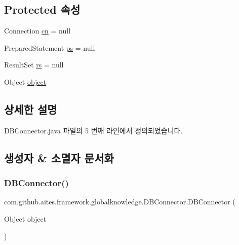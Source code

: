 \subsection*{Protected 속성}
\begin{DoxyCompactItemize}
\item 
Connection \mbox{\hyperlink{classcom_1_1github_1_1aites_1_1framework_1_1globalknowledge_1_1_d_b_connector_af00c95ca08c2b39cb47ee4286e9f2469}{cn}} = null
\item 
Prepared\+Statement \mbox{\hyperlink{classcom_1_1github_1_1aites_1_1framework_1_1globalknowledge_1_1_d_b_connector_a2a6dbc151015e5fe147a4d155ae7a145}{ps}} = null
\item 
Result\+Set \mbox{\hyperlink{classcom_1_1github_1_1aites_1_1framework_1_1globalknowledge_1_1_d_b_connector_a36c87b41d86e8382bea688b2ca209764}{rs}} = null
\item 
Object \mbox{\hyperlink{classcom_1_1github_1_1aites_1_1framework_1_1globalknowledge_1_1_d_b_connector_ab6f6f9f00c22d311dca48a3a424fd6a3}{object}}
\end{DoxyCompactItemize}


\subsection{상세한 설명}


D\+B\+Connector.\+java 파일의 5 번째 라인에서 정의되었습니다.



\subsection{생성자 \& 소멸자 문서화}
\mbox{\label{classcom_1_1github_1_1aites_1_1framework_1_1globalknowledge_1_1_d_b_connector_a77b6f20c18ea2320ff73ab8d135ce00b}} 
\subsubsection{\texorpdfstring{D\+B\+Connector()}{DBConnector()}\hspace{0.1cm}{\footnotesize\ttfamily [1/3]}}
{\footnotesize\ttfamily com.\+github.\+aites.\+framework.\+globalknowledge.\+D\+B\+Connector.\+D\+B\+Connector (\begin{DoxyParamCaption}\item[{Object}]{object }\end{DoxyParamCaption})}




